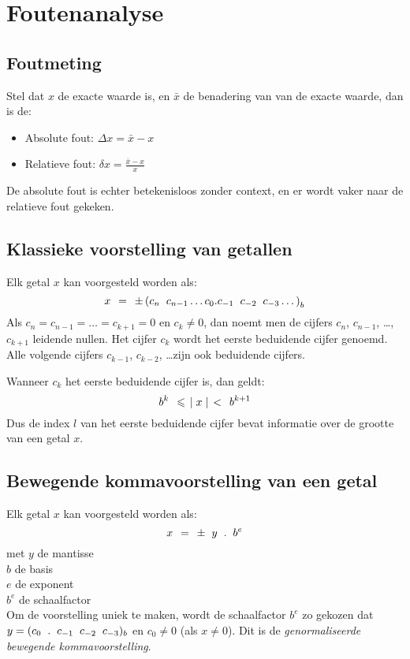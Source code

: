 \documentclass[11pt]{report}
\def \eq {\hspace{1.5mm}=\hspace{1.5mm}}
\def \lesseq {\hspace{1.5mm}\leqslant\hspace{1.5mm}}
\def \less {\hspace{1.5mm}<\hspace{1.5mm}}
\def \h {\hspace{2mm}}
\begin{document}
\chapter{Foutenanalyse}
\section{Foutmeting}
	Stel dat $x$ de exacte waarde is, en $\bar{x}$ de benadering van van de exacte waarde, dan is de:
	\begin{itemize}
		\item Absolute fout: $\Delta x = \bar x - x$
		\item Relatieve fout: $\delta x = \frac{\bar x - x}{x}$ 
	\end{itemize}
	De absolute fout is echter betekenisloos zonder context, en er wordt vaker naar de relatieve fout gekeken.
	
\section{Klassieke voorstelling van getallen}
	Elk getal $x$ kan voorgesteld worden als:
	$$x \eq \pm \left(c_n \h c_{n-1} \dots c_0 . c_{-1} \h c_{-2} \h c_{-3} \dots\right)_b$$
	Als $c_n = c_{n-1} = \dots = c_{k+1} = 0$ en $c_k \neq 0$, dan noemt men de cijfers $c_n$, $c_{n-1}$, \dots, $c_{k+1}$ leidende nullen. Het cijfer $c_k$ wordt het eerste beduidende cijfer genoemd. Alle volgende cijfers $c_{k-1}$, $c_{k-2}$, \dots zijn ook beduidende cijfers.
		
	Wanneer $c_k$ het eerste beduidende cijfer is, dan geldt:
	\begin{equation}
		b^k \lesseq \mid x \mid \less b^{k+1}
	\end{equation}
	Dus de index $l$ van het eerste beduidende cijfer bevat informatie over de grootte van een getal $x$.
		
\section{Bewegende kommavoorstelling van een getal}
	Elk getal $x$ kan voorgesteld worden als:
	$$x \eq \pm\h y \h.\h b^e$$
	 \hspace*{8.5mm}met \h $y$ \hspace{1.4mm} de mantisse\\
	 \hspace*{17mm} $b$ \hspace{1.4mm} de basis\\
	 \hspace*{17mm} $e$ \hspace{1.4mm} de exponent\\
	 \hspace*{17mm} $b^e$ \hspace{0mm} de schaalfactor\\
	 Om de voorstelling uniek te maken, wordt de schaalfactor $b^e$ zo gekozen dat $y = (c_0 \h . \h c_{-1} \h c_{-2} \h c_{-3})_b$ en $c_0 \neq 0$ (als $x \neq 0$). Dit is de \textit{genormaliseerde bewegende kommavoorstelling}.
	 
\end{document}
